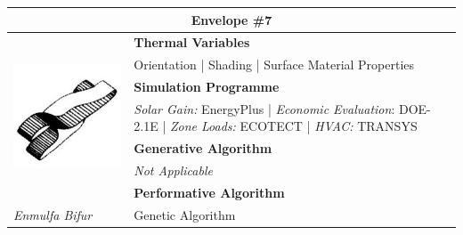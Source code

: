 \begin{table}
	\begin{tabular}{ | m{6cm} | m{14cm} |}
	\toprule
	\multicolumn{2}{c}{Envelope \#{}7} \\[1cm] \hline
	\multirow{7}{*}{\includegraphics[width=5.3cm]{./Images/16-Envelope7}} & \textbf{Thermal Variables} \\[1cm]
	& Orientation | Shading | Surface Material Properties\vspace{0.5cm}\\ \cline{2-2}
		 & \textbf{Simulation Programme} \\[1cm]
		 & \emph{Solar Gain:} EnergyPlus | \emph{Economic Evaluation}: DOE-2.1E | \emph{Zone Loads:} ECOTECT | \emph{HVAC:} TRANSYS \vspace{0.5cm}\\ \cline{2-2}
		 & \textbf{Generative Algorithm} \\[1cm]
		 & \emph{Not Applicable}\vspace{0.5cm}\\ \cline{2-2}
		 & \textbf{Performative Algorithm} \\[1cm]
		 \emph{Enmulfa Bifur} &  Genetic Algorithm\vspace{0.5cm}\\
	\bottomrule
	\end{tabular}
\end{table}

\clearpage

